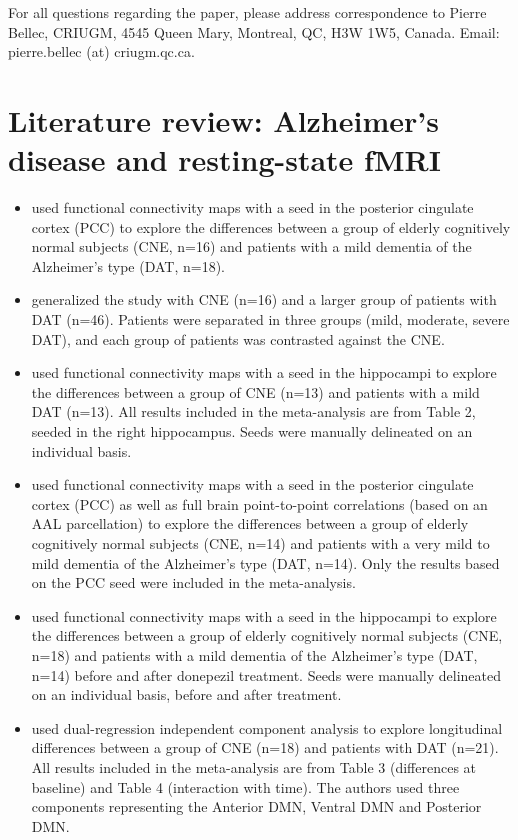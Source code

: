 \documentclass[authoryear]{elsarticle}
\begin{document}
For all questions regarding the paper, please address correspondence to Pierre Bellec, CRIUGM, 4545 Queen Mary, Montreal, QC, H3W 1W5, Canada. Email: pierre.bellec (at) criugm.qc.ca.\\

\section*{Literature review: Alzheimer’s disease and resting-state fMRI} 
\begin{itemize}
\item \cite{Zhang2009a} used functional connectivity maps with a seed in the posterior cingulate cortex (PCC) to explore the differences between a group of elderly cognitively normal subjects (CNE, n=16) and patients with a mild dementia of the Alzheimer’s type (DAT, n=18).

\item \cite{Zhang2010} generalized the \cite{Zhang2009a} study with CNE (n=16) and a larger group of patients with DAT (n=46). Patients were separated in three groups (mild, moderate, severe DAT), and each group of patients was contrasted against the CNE.
\item \cite{Wang2006a} used functional connectivity maps with a seed in the hippocampi to explore the differences between a group of CNE (n=13) and patients with a mild DAT (n=13). All results included in the meta-analysis are from Table 2, seeded in the right hippocampus. Seeds were manually delineated on an individual basis.
\item \cite{Wang2007a} used functional connectivity maps with a seed in the posterior cingulate cortex (PCC) as well as full brain point-to-point correlations (based on an AAL parcellation) to explore the differences between a group of elderly cognitively normal subjects (CNE, n=14) and patients with a very mild to mild dementia of the Alzheimer’s type (DAT, n=14). Only the results based on the PCC seed were included in the meta-analysis.
\item \cite{Goveas2011} used functional connectivity maps with a seed in the hippocampi to explore the differences between a group of elderly cognitively normal subjects (CNE, n=18) and patients with a mild dementia of the Alzheimer’s type (DAT, n=14) before and after donepezil treatment. Seeds were manually delineated on an individual basis, before and after treatment.
\item \cite{Damoiseaux2012} used dual-regression independent component analysis to explore longitudinal differences between a group of CNE (n=18) and patients with DAT (n=21). All results included in the meta-analysis are from Table 3 (differences at baseline) and Table 4 (interaction with time). The authors used three components representing the Anterior DMN, Ventral DMN and Posterior DMN.
\end{itemize}
\end{document}
